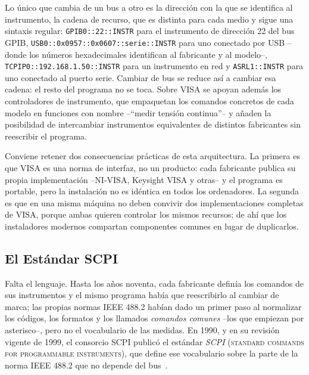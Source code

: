 Lo único que cambia de un bus a otro es la dirección con la que se identifica al instrumento, la cadena de recurso, que es distinta para cada medio y sigue una sintaxis regular: \texttt{GPIB0::22::INSTR} para el instrumento de dirección 22 del bus GPIB, \texttt{USB0::0x0957::0x0607::serie::INSTR} para uno conectado por USB --donde los números hexadecimales identifican al fabricante y al modelo--, \texttt{TCPIP0::192.168.1.50::INSTR} para un instrumento en red y \texttt{ASRL1::INSTR} para uno conectado al puerto serie. Cambiar de bus se reduce así a cambiar esa cadena: el resto del programa no se toca. Sobre VISA se apoyan además los controladores de instrumento, que empaquetan los comandos concretos de cada modelo en funciones con nombre --``medir tensión continua''-- y añaden la posibilidad de intercambiar instrumentos equivalentes de distintos fabricantes sin reescribir el programa.

Conviene retener dos consecuencias prácticas de esta arquitectura. La primera es que VISA es una norma de interfaz, no un producto: cada fabricante publica su propia implementación --NI-VISA, Keysight VISA y otras-- y el programa es portable, pero la instalación no es idéntica en todos los ordenadores. La segunda es que en una misma máquina no deben convivir dos implementaciones completas de VISA, porque ambas quieren controlar los mismos recursos; de ahí que los instaladores modernos compartan componentes comunes en lugar de duplicarlos.

\subsection{El Estándar SCPI}\label{sub:scpi}

Falta el lenguaje. Hasta los años noventa, cada fabricante definía los comandos de sus instrumentos y el mismo programa había que reescribirlo al cambiar de marca; las propias normas IEEE 488.2 habían dado un primer paso al normalizar los códigos, los formatos y los llamados \emph{comandos comunes} --los que empiezan por asterisco--, pero no el vocabulario de las medidas. En 1990, y en su revisión vigente de 1999, el consorcio SCPI publicó el estándar \emph{SCPI} (\textsc{standard commands for programmable instruments}), que define ese vocabulario sobre la parte de la norma IEEE 488.2 que no depende del bus~\cite{ieee488_2_1992,scpi_1999}.

